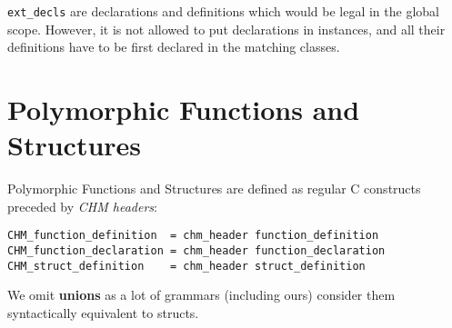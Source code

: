 \lstinline{ext_decls} are declarations and definitions which would be legal in the global scope. However, it is not allowed to put declarations in instances, and all their definitions have to be first declared in the matching classes.

\section{Polymorphic Functions and Structures}

Polymorphic Functions and Structures are defined as regular C constructs preceded by \emph{CHM headers}:

\begin{lstlisting}
CHM_function_definition  = chm_header function_definition
CHM_function_declaration = chm_header function_declaration
CHM_struct_definition    = chm_header struct_definition
\end{lstlisting}

We omit \textbf{unions} as a lot of grammars (including ours) consider them syntactically equivalent to structs.
